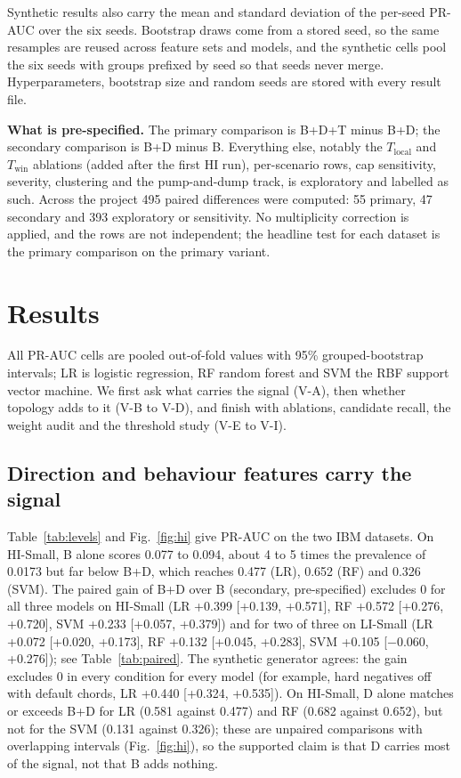 \documentclass[conference]{IEEEtran}
\newcommand{\mi}{\ensuremath{-}}
\begin{document}
Synthetic results also carry the mean and standard deviation of the per-seed PR-AUC over the six seeds. Bootstrap draws come from a stored seed, so the same resamples are reused across feature sets and models, and the synthetic cells pool the six seeds with groups prefixed by seed so that seeds never merge. Hyperparameters, bootstrap size and random seeds are stored with every result file.

\textbf{What is pre-specified.} The primary comparison is B+D+T minus B+D; the secondary comparison is B+D minus B. Everything else, notably the $T_{\mathrm{local}}$ and $T_{\mathrm{win}}$ ablations (added after the first HI run), per-scenario rows, cap sensitivity, severity, clustering and the pump-and-dump track, is exploratory and labelled as such. Across the project 495 paired differences were computed: 55 primary, 47 secondary and 393 exploratory or sensitivity. No multiplicity correction is applied, and the rows are not independent; the headline test for each dataset is the primary comparison on the primary variant.

\section{Results}
\label{sec:results}

All PR-AUC cells are pooled out-of-fold values with 95\% grouped-bootstrap intervals; LR is logistic regression, RF random forest and SVM the RBF support vector machine. We first ask what carries the signal (V-A), then whether topology adds to it (V-B to V-D), and finish with ablations, candidate recall, the weight audit and the threshold study (V-E to V-I).

\subsection{Direction and behaviour features carry the signal}
Table~\ref{tab:levels} and Fig.~\ref{fig:hi} give PR-AUC on the two IBM datasets. On HI-Small, B alone scores 0.077 to 0.094, about 4 to 5 times the prevalence of 0.0173 but far below B+D, which reaches 0.477 (LR), 0.652 (RF) and 0.326 (SVM). The paired gain of B+D over B (secondary, pre-specified) excludes 0 for all three models on HI-Small (LR +0.399 [+0.139, +0.571], RF +0.572 [+0.276, +0.720], SVM +0.233 [+0.057, +0.379]) and for two of three on LI-Small (LR +0.072 [+0.020, +0.173], RF +0.132 [+0.045, +0.283], SVM +0.105 [\mi0.060, +0.276]); see Table~\ref{tab:paired}. The synthetic generator agrees: the gain excludes 0 in every condition for every model (for example, hard negatives off with default chords, LR +0.440 [+0.324, +0.535]). On HI-Small, D alone matches or exceeds B+D for LR (0.581 against 0.477) and RF (0.682 against 0.652), but not for the SVM (0.131 against 0.326); these are unpaired comparisons with overlapping intervals (Fig.~\ref{fig:hi}), so the supported claim is that D carries most of the signal, not that B adds nothing.
\end{document}
